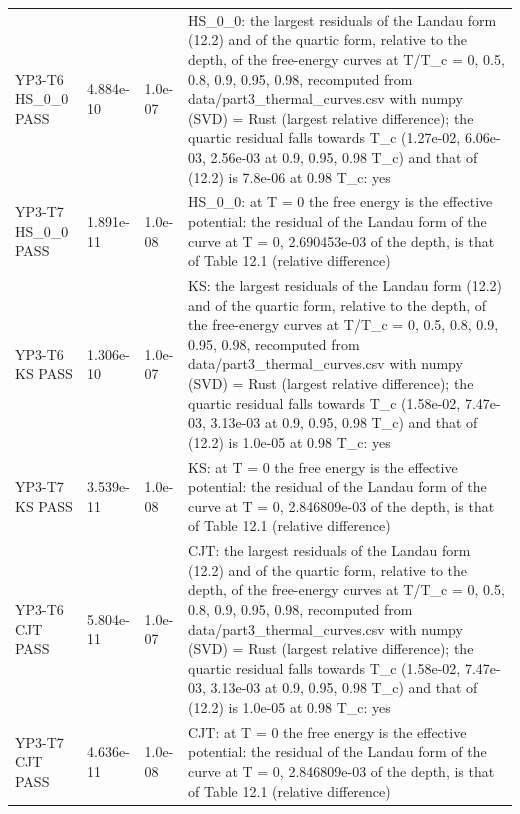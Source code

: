 \documentclass[aps,prd,onecolumn,superscriptaddress,nofootinbib,floatfix,longbibliography]{revtex4-2}
\begin{document}
\begin{longtable}{p{}p{}p{}p{}}
YP3-T6 HS\_0\_0 \newline PASS & 4.884e-10 & 1.0e-07 & HS\_0\_0: the largest residuals of the Landau form (12.2) and of the quartic form, relative to the depth, of the free-energy curves at T/T\_c = 0, 0.5, 0.8, 0.9, 0.95, 0.98, recomputed from data/part3\_thermal\_curves.csv with numpy (SVD) = Rust (largest relative difference); the quartic residual falls towards T\_c (1.27e-02, 6.06e-03, 2.56e-03 at 0.9, 0.95, 0.98 T\_c) and that of (12.2) is 7.8e-06 at 0.98 T\_c: yes \\
YP3-T7 HS\_0\_0 \newline PASS & 1.891e-11 & 1.0e-08 & HS\_0\_0: at T = 0 the free energy is the effective potential: the residual of the Landau form of the curve at T = 0, 2.690453e-03 of the depth, is that of Table 12.1 (relative difference) \\
YP3-T6 KS \newline PASS & 1.306e-10 & 1.0e-07 & KS: the largest residuals of the Landau form (12.2) and of the quartic form, relative to the depth, of the free-energy curves at T/T\_c = 0, 0.5, 0.8, 0.9, 0.95, 0.98, recomputed from data/part3\_thermal\_curves.csv with numpy (SVD) = Rust (largest relative difference); the quartic residual falls towards T\_c (1.58e-02, 7.47e-03, 3.13e-03 at 0.9, 0.95, 0.98 T\_c) and that of (12.2) is 1.0e-05 at 0.98 T\_c: yes \\
YP3-T7 KS \newline PASS & 3.539e-11 & 1.0e-08 & KS: at T = 0 the free energy is the effective potential: the residual of the Landau form of the curve at T = 0, 2.846809e-03 of the depth, is that of Table 12.1 (relative difference) \\
YP3-T6 CJT \newline PASS & 5.804e-11 & 1.0e-07 & CJT: the largest residuals of the Landau form (12.2) and of the quartic form, relative to the depth, of the free-energy curves at T/T\_c = 0, 0.5, 0.8, 0.9, 0.95, 0.98, recomputed from data/part3\_thermal\_curves.csv with numpy (SVD) = Rust (largest relative difference); the quartic residual falls towards T\_c (1.58e-02, 7.47e-03, 3.13e-03 at 0.9, 0.95, 0.98 T\_c) and that of (12.2) is 1.0e-05 at 0.98 T\_c: yes \\
YP3-T7 CJT \newline PASS & 4.636e-11 & 1.0e-08 & CJT: at T = 0 the free energy is the effective potential: the residual of the Landau form of the curve at T = 0, 2.846809e-03 of the depth, is that of Table 12.1 (relative difference) \\

\end{longtable}
\end{document}
